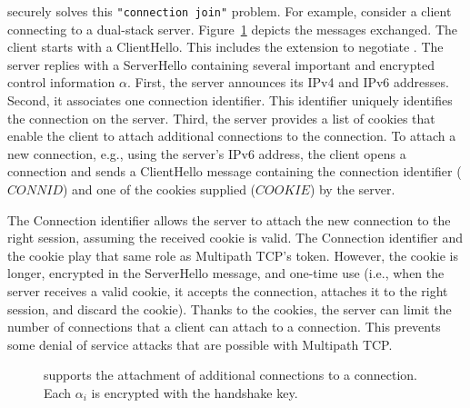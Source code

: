 \tcpls securely solves this \texttt{"connection join"} problem. For example, consider a
client connecting to a dual-stack server. Figure~\ref{fig:join-example} depicts
the \tls messages exchanged.  The client starts with a ClientHello. This includes
the \tcpls extension to negotiate \tcpls. The server replies with a ServerHello
containing several important and encrypted control information $\alpha$. First, the server announces
its IPv4 and IPv6 addresses. Second, it associates one connection identifier.
This identifier uniquely identifies the connection on the server. Third, the
server provides a list of cookies that enable the client to attach additional
\tcp connections to the \tcpls connection. To attach a new connection, e.g., using
the server's IPv6 address, the client opens a \tcp connection and sends a
ClientHello message containing the connection identifier ($CONNID$) and one of the cookies
supplied ($COOKIE$) by the server.

The Connection identifier allows the server to attach the new \tcp connection to
the right \tcpls session, assuming the received cookie is valid. The Connection
identifier and the cookie
play that same role as Multipath TCP's token. However, the cookie is longer, encrypted in
the ServerHello message, and one-time use (i.e., when the server receives a valid
cookie, it accepts the connection, attaches it to the right \tcpls session, and
discard the cookie). Thanks to the cookies, the server can
limit the number of \tcp connections that a client can attach to a \tcpls
connection.
This prevents some denial of service attacks that are
possible with Multipath TCP.

\begin{figure}

  \caption{\tcpls supports the attachment of additional \tcp
    connections to a \tcpls connection. Each $\alpha_i$ is encrypted with the
    handshake key.}
  \label{fig:join-example}
\end{figure}

